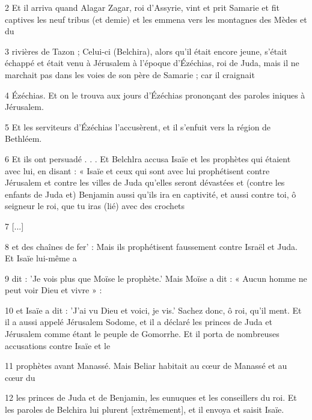 \par 2 Et il arriva quand Alagar Zagar, roi d'Assyrie, vint et prit Samarie et fit captives les neuf tribus (et demie) et les emmena vers les montagnes des Mèdes et du

\par 3 rivières de Tazon ; Celui-ci (Belchira), alors qu'il était encore jeune, s'était échappé et était venu à Jérusalem à l'époque d'Ézéchias, roi de Juda, mais il ne marchait pas dans les voies de son père de Samarie ; car il craignait

\par 4 Ézéchias. Et on le trouva aux jours d'Ézéchias prononçant des paroles iniques à Jérusalem.

\par 5 Et les serviteurs d'Ézéchias l'accusèrent, et il s'enfuit vers la région de Bethléem.

\par 6 Et ils ont persuadé . . . Et Belchlra accusa Isaïe et les prophètes qui étaient avec lui, en disant : « Isaïe et ceux qui sont avec lui prophétisent contre Jérusalem et contre les villes de Juda qu'elles seront dévastées et (contre les enfants de Juda et) Benjamin aussi qu'ils ira en captivité, et aussi contre toi, ô seigneur le roi, que tu iras (lié) avec des crochets

\par 7 [...]

\par 8 et des chaînes de fer' : Mais ils prophétisent faussement contre Israël et Juda. Et Isaïe lui-même a

\par 9 dit : 'Je vois plus que Moïse le prophète.' Mais Moïse a dit : « Aucun homme ne peut voir Dieu et vivre » :

\par 10 et Isaïe a dit : 'J'ai vu Dieu et voici, je vis.' Sachez donc, ô roi, qu'il ment. Et il a aussi appelé Jérusalem Sodome, et il a déclaré les princes de Juda et Jérusalem comme étant le peuple de Gomorrhe. Et il porta de nombreuses accusations contre Isaïe et le

\par 11 prophètes avant Manassé. Mais Beliar habitait au cœur de Manassé et au cœur du

\par 12 les princes de Juda et de Benjamin, les eunuques et les conseillers du roi. Et les paroles de Belchira lui plurent [extrêmement], et il envoya et saisit Isaïe.

